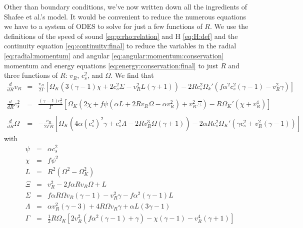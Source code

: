 \documentclass[]{article}
\newcommand{\ddR}{\frac{d}{dR}}
\begin{document}
Other than boundary conditions, we've now written down all the
ingredients of Shafee et al.'s model. It would be convenient to reduce
the numerous equations we have to a system of ODES to solve for just a
few functions of $R$. We use the definitions of the speed of sound \eqref{eq:p:rho:relation} and H \eqref{eq:H:def} and the continuity
equation \eqref{eq:continuity:final} to reduce the variables in the
radial \eqref{eq:radial:momentum} and angular
\eqref{eq:angular:momentum:conservation} momentum and energy equations
\eqref{eq:energy:conservation:final} to just $R$ and three functions
of $R$: $v_R$, $c_s^2$, and $\Omega$. We find that
\begin{eqnarray}
  \label{eq:ODE:system:dv}
  \ddR v_R &=& \frac{v_R}{2\Gamma} \left[\Omega_K \left(3 (\gamma-1) \chi + 2 c_s^2\Sigma - v_R^2 L (\gamma+1)\right)
    -2 R c_s^2 \Omega_k' \left(f \alpha^2 c_s^2 (\gamma-1) - v_R^2\gamma\right)\right]\\
  &&\nonumber\\
  \label{eq:ODE:system:dc2s}
  \ddR c_s^2 &=& \frac{(\gamma-1)c_s^2}{\Gamma}\left[\Omega_K\left(2\chi + f\psi\left(\alpha L 
        + 2 R v_R\Omega -\alpha v_R^2\right) + v_R^2 \Xi\right)
    - R \Omega_K'\left(\chi+v_R^4\right)\right]\\
  &&\nonumber\\
  \label{eq:ODE:system:domega}
  \ddR \Omega &=& -\frac{v_R}{2\Gamma R}\left[\Omega_K \left(4\alpha (c_s^2)^2 \gamma +c_s^2\Lambda - 2 R v_R^3 \Omega(\gamma+1)\right) - 2\alpha R c_s^2 \Omega_K'\left(\gamma c_s^2 + v_R^2(\gamma-1)\right)\right]
\end{eqnarray}
with 
\begin{eqnarray}
  \label{eq:def:psi}
  \psi &=& \alpha c_s^2\\
  \label{eq:def:chi}
  \chi &=& f\psi^2\\
  \label{eq:def:L}
  L &=& R^2\left(\Omega^2 - \Omega_K^2\right)\\
  \label{eq:def:Xi}
  \Xi &=& v_R^2 - 2 f \alpha R v_R \Omega + L\\ %
  \label{eq:def:sigma}
  \Sigma &=& f\alpha R\Omega v_R(\gamma -1) -v_R^2 \gamma - f\alpha^2 (\gamma-1)L\\
  \label{eq:def:lambda}
  \Lambda &=& \alpha v_R^2(\gamma-3) + 4 R\Omega v_R \gamma + \alpha L \left(3\gamma - 1\right)\\
  \label{eq:def:Gamma}
  \Gamma &=&\frac{1}{2} R \Omega_K \left[2v_R^2\left(f\alpha^2 (\gamma -1)+\gamma\right) - \chi(\gamma-1) - v_R^4(\gamma+1)\right]
\end{eqnarray}
\end{document}
